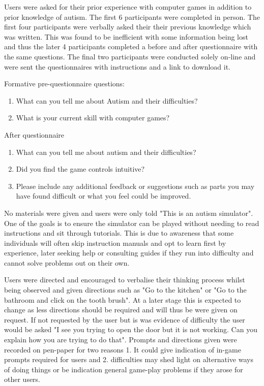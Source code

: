 Users were asked for their prior experience with computer games in addition to prior knowledge of autism. The first 6 participants were completed in person. The first four participants were verbally asked their their previous knowledge which was written. This was found to be inefficient with some information being lost and thus the later 4 participants completed a before and after questionnaire with the same questions. The final two participants were conducted solely on-line and were sent the questionnaires with instructions and a link to download it. 

Formative pre-questionnaire questions:
\begin{enumerate}
\item What can you tell me about Autism and their difficulties?
\item What is your current skill with computer games?
\end{enumerate}

After questionnaire 
\begin{enumerate}
\item What can you tell me about autism and their difficulties?
\item Did you find the game controls intuitive?
\item Please include any additional feedback or suggestions such as parts you may have found difficult or what you feel could be improved.
\end{enumerate}

No materials were given and users were only told "This is an autism simulator". One of the goals is to ensure the simulator can be played without needing to read instructions and sit through tutorials. This is due to awareness that some individuals will often skip instruction manuals and opt to learn first by experience, later seeking help or consulting guides if they run into difficulty and cannot solve problems out on their own.

Users were directed and encouraged to verbalise their thinking process whilst being observed and given directions such as "Go to the kitchen" or "Go to the bathroom and click on the tooth brush". At a later stage this is expected to change as less directions should be required and will thus be were given on request. If not requested by the user but is was evidence of difficulty the user would be asked "I see you trying to open the door but it is not working. Can you explain how you are trying to do that". Prompts and directions given were recorded on pen-paper for two reasons 1. It could give indication of in-game prompts required for users and 2. difficulties may shed light on alternative ways of doing things or be indication general game-play problems if they arose for other users.

